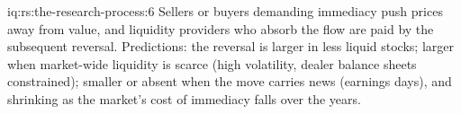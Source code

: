 \begin{solution}{iq:rs:the-research-process:6}
Sellers or buyers demanding immediacy push prices away from value, and liquidity providers who absorb the flow are paid by the
subsequent reversal. Predictions: the reversal is larger in less liquid stocks; larger when market-wide liquidity is scarce
(high volatility, dealer balance sheets constrained); smaller or absent when the move carries news (earnings days), and
shrinking as the market's cost of immediacy falls over the years.
\end{solution}
